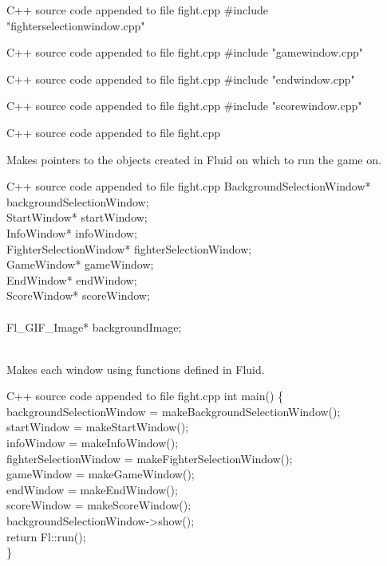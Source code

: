 \documentclass{article}
\begin{document}
\begin{GFT}{C++ source code appended to file fight.cpp}
\+\#include "fighterselectionwindow.cpp"\\
\end{GFT}
\begin{GFT}{C++ source code appended to file fight.cpp}
\+\#include "gamewindow.cpp"\\
\end{GFT}
\begin{GFT}{C++ source code appended to file fight.cpp}
\+\#include "endwindow.cpp"\\
\end{GFT}
\begin{GFT}{C++ source code appended to file fight.cpp}
\+\#include "scorewindow.cpp"\\
\end{GFT}
\begin{GFT}{C++ source code appended to file fight.cpp}
\end{GFT}
Makes pointers to the objects created in Fluid on which to run the game on.
\begin{GFT}{C++ source code appended to file fight.cpp}
\+BackgroundSelectionWindow* backgroundSelectionWindow;\\
\+StartWindow* startWindow;\\
\+InfoWindow* infoWindow;\\
\+FighterSelectionWindow* fighterSelectionWindow;\\
\+GameWindow* gameWindow;\\
\+EndWindow* endWindow;\\
\+ScoreWindow* scoreWindow;\\
\+\\
\+Fl\_GIF\_Image* backgroundImage;\\
\+\\
\end{GFT}
Makes each window using functions defined in Fluid.
\begin{GFT}{C++ source code appended to file fight.cpp}
\+int main() \{\\
\+    backgroundSelectionWindow = makeBackgroundSelectionWindow();\\
\+    startWindow = makeStartWindow();\\
\+    infoWindow = makeInfoWindow();\\
\+    fighterSelectionWindow = makeFighterSelectionWindow();\\
\+    gameWindow = makeGameWindow();\\
\+    endWindow = makeEndWindow();\\
\+    scoreWindow = makeScoreWindow();\\
\+    backgroundSelectionWindow->show();\\
\+    return Fl::run();\\
\+\}\\
\end{GFT}
\end{document}
